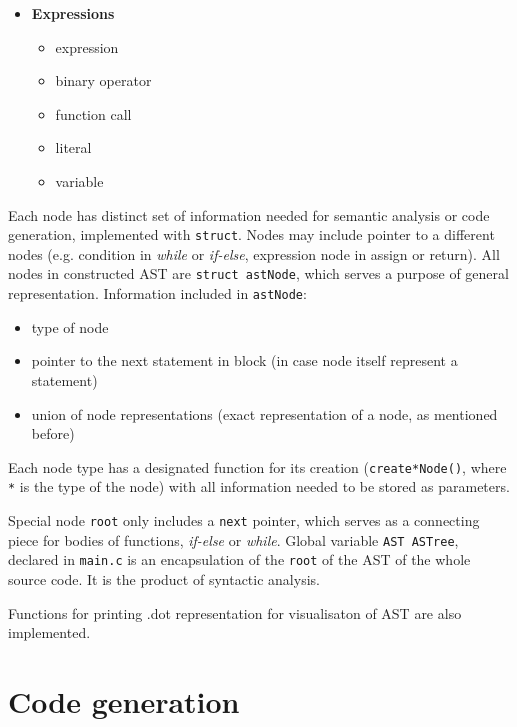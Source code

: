 \documentclass[a4paper, 11pt]{article}
\begin{document}
\begin{minipage}[t]{0.3\textwidth}
\begin{itemize}
    \item \textbf{Expressions}
    \begin{itemize}
        \itemsep-0.1em
        \item expression
        \item binary operator
        \item function call
        \item literal
        \item variable
    \end{itemize}
\end{itemize}
\end{minipage}
\newline
\par
Each node has distinct set of information needed for semantic analysis or code generation, implemented with
\verb|struct|. Nodes may include pointer to a different nodes (e.g. condition in \textit{while} or \textit{if-else}, expression node in assign or return).
All nodes in constructed AST are \verb|struct astNode|, which serves a purpose of general representation.
Information included in \verb|astNode|:
\begin{itemize}
    \item type of node
    \item pointer to the next statement in block (in case node itself represent a statement)
    \item union of node representations (exact representation of a node, as mentioned before)
\end{itemize}

Each node type has a designated function for its creation (\verb|create*Node()|, where \verb|*| is the type of the node)
with all information needed to be stored as parameters.
\par Special node \verb|root| only includes a \verb|next| pointer, which serves as a connecting piece for
bodies of functions, \textit{if-else} or \textit{while}. Global variable \verb|AST ASTree|, declared in \verb|main.c| is an
encapsulation of the \verb|root| of the AST of the whole source code. It is the product of syntactic analysis.
\par  Functions for printing .dot representation for visualisaton of AST are also implemented.

\section{Code generation}\label{sec:CODEGEN}
\end{document}

